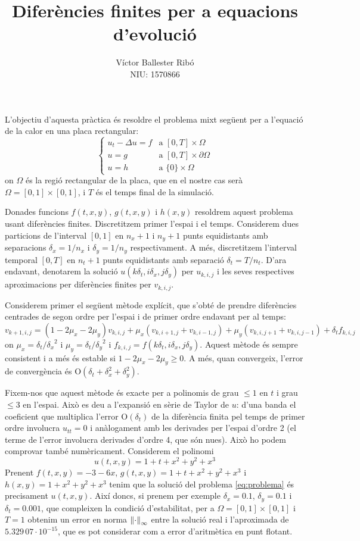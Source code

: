 \documentclass[10pt,a4paper]{article}
\title{\bfseries\Large Diferències finites per a equacions d'evolució}
\author{Víctor Ballester Ribó\\NIU: 1570866}
\date{\parbox{\linewidth}{\centering
  Integració numèrica d'equacions en derivades parcials\endgraf
  Grau en Matemàtiques\endgraf
  Universitat Autònoma de Barcelona\endgraf
  Juny de 2023}}
\renewcommand{\O}[1]{\mathrm{O}\left(#1\right)} %
\theoremstyle{definition}
\theoremstyle{remark}
\begin{document}
\maketitle
L'objectiu d'aquesta pràctica és resoldre el problema mixt següent per a l'equació de la calor en una placa rectangular:
\begin{equation}\label{eq:problema}
  \begin{cases}
    u_t-\Delta u = f & \text{a } [0,T]\times\Omega         \\
    u=g              & \text{a } [0,T]\times\partial\Omega \\
    u=h              & \text{a } \{0\}\times \Omega
  \end{cases}
\end{equation}
on $\Omega$ és la regió rectangular de la placa, que en el nostre cas serà $\Omega = [0,1]\times[0,1]$, i $T$ és el temps final de la simulació.

Donades funcions $f(t,x,y)$, $g(t,x,y)$ i $h(x,y)$ resoldrem aquest problema usant diferències finites. Discretitzem primer l'espai i el temps. Considerem dues particions de l'interval $[0,1]$ en $n_x+1$ i $n_y+1$ punts equidistants amb separacions $\delta_x=1/n_x$ i $\delta_y=1/n_y$ respectivament. A més, discretitzem l'interval temporal $[0,T]$ en $n_t+1$ punts equidistants amb separació $\delta_t=T/n_t$. D'ara endavant, denotarem la solució $u(k\delta_t, i\delta_x, j\delta_y)$ per $u_{k,i,j}$ i les seves respectives aproximacions per diferències finites per $v_{k,i,j}$.

Considerem primer el següent mètode explícit, que s'obté de prendre diferències centrades de segon ordre per l'espai i de primer ordre endavant per al temps:
$$
  v_{k+1,i,j} = (1-2\mu_x - 2\mu_y) v_{k,i,j} + \mu_x (v_{k,i+1,j} + v_{k,i-1,j}) + \mu_y (v_{k,i,j+1} + v_{k,i,j-1}) + \delta_t f_{k,i,j}
$$
on $\mu_x = \delta_t/{\delta_x}^2$ i $\mu_y = \delta_t/{\delta_y}^2$ i $f_{k,i,j}=f(k\delta_t, i\delta_x, j\delta_y)$. Aquest mètode és sempre consistent i a més és estable si $1- 2\mu_x -2 \mu_y \geq 0$. A més, quan convergeix, l'error de convergència és $\O{\delta_t + \delta_x^2 + \delta_y^2}$.

Fixem-nos que aquest mètode és exacte per a polinomis de grau $\leq 1$ en $t$ i grau $\leq 3$ en l'espai. Això es deu a l'expansió en sèrie de Taylor de $u$: d'una banda el coeficient que multiplica l'error $\O{\delta_t}$ de la diferència finita pel temps de primer ordre involucra $u_{tt}=0$ i anàlogament amb les derivades per l'espai d'ordre 2 (el terme de l'error involucra derivades d'ordre 4, que són nu\lgem es). Això ho podem comprovar també numèricament. Considerem el polinomi
$$u(t,x,y)=1+t+x^2+y^2+x^3$$
Prenent $f(t,x,y)= -3-6x$, $g(t,x,y)=1+t+x^2+y^2+x^3$ i $h(x,y)=1+x^2+y^2+x^3$ tenim que la solució del problema \eqref{eq:problema} és precisament $u(t,x,y)$. Així doncs, si prenem per exemple $\delta_x=0.1$, $\delta_y=0.1$ i $\delta_t=0.001$, que compleixen la condició d'estabilitat, per a $\Omega = [0,1]\times[0,1]$ i $T=1$ obtenim un error en norma $\norm{\cdot}_\infty$ entre la solució real i l'aproximada de $5.329\,07\cdot 10^{-15}$, que es pot considerar com a error d'aritmètica en punt flotant.\vspace*{0.25cm}
\end{document}
